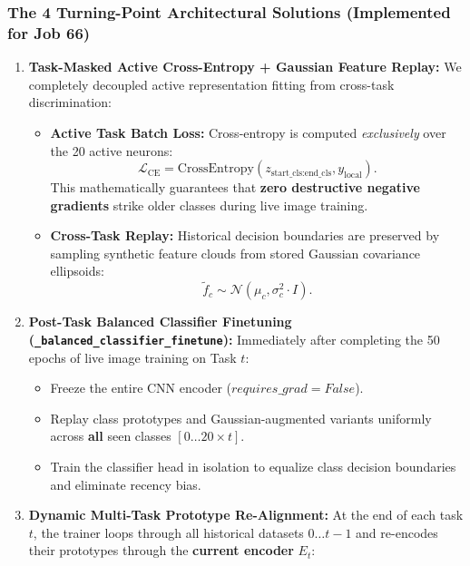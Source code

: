 \documentclass[11pt,a4paper]{article}
\begin{document}
    \subsubsection{The 4 Turning-Point Architectural Solutions (Implemented for Job 66)}
    \begin{enumerate}[leftmargin=*]
        \item \textbf{Task-Masked Active Cross-Entropy + Gaussian Feature Replay:}
        We completely decoupled active representation fitting from cross-task discrimination:
        \begin{itemize}
            \item \textbf{Active Task Batch Loss:} Cross-entropy is computed \textit{exclusively} over the 20 active neurons:
            \begin{equation}
                \mathcal{L}_{\text{CE}} = \text{CrossEntropy}(z_{\text{start\_cls} : \text{end\_cls}}, y_{\text{local}}).
            \end{equation}
            This mathematically guarantees that \textbf{zero destructive negative gradients} strike older classes during live image training.
            \item \textbf{Cross-Task Replay:} Historical decision boundaries are preserved by sampling synthetic feature clouds from stored Gaussian covariance ellipsoids:
            \begin{equation}
                \tilde{f}_c \sim \mathcal{N}(\mu_c, \sigma_c^2 \cdot I).
            \end{equation}
        \end{itemize}
        \item \textbf{Post-Task Balanced Classifier Finetuning (\texttt{\_balanced\_classifier\_finetune}):}
        Immediately after completing the 50 epochs of live image training on Task $t$:
        \begin{itemize}
            \item Freeze the entire CNN encoder ($requires\_grad = False$).
            \item Replay class prototypes and Gaussian-augmented variants uniformly across \textbf{all} seen classes $[0 \dots 20 \times t]$.
            \item Train the classifier head in isolation to equalize class decision boundaries and eliminate recency bias.
        \end{itemize}
        \item \textbf{Dynamic Multi-Task Prototype Re-Alignment:}
        At the end of each task $t$, the trainer loops through all historical datasets $0 \dots t-1$ and re-encodes their prototypes through the \textbf{current encoder} $E_t$:

\end{enumerate}
\end{document}
